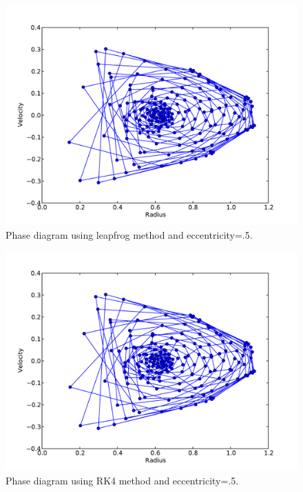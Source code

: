 \documentclass[a4paper,11pt]{article}
\begin{document}
\begin{figure}[h!]
\begin{center}
\includegraphics[scale=.7]{R_V_5lf.pdf}
\caption{Phase diagram using leapfrog method and eccentricity=.5.}
\end{center}
\end{figure}

\begin{figure}[h!]
\begin{center}
\includegraphics[scale=.7]{R_V_5rk4.pdf}
\caption{Phase diagram using RK4 method and eccentricity=.5.}
\end{center}
\end{figure}
\end{document}
